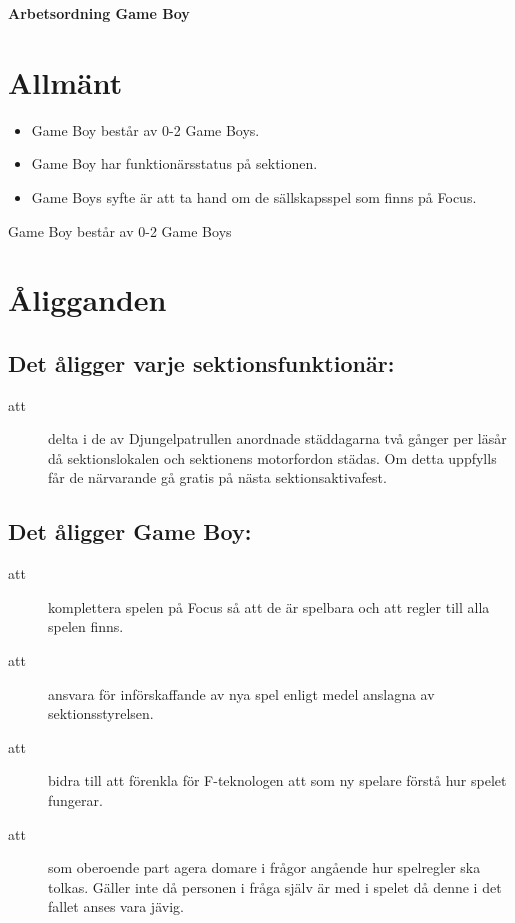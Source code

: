 \renewcommand{\dateseparator}{-} %

\renewcommand{\forening}{Game Boy}

\begin{center}
\LARGE{\textbf{Arbetsordning \forening}}
\end{center}


\section{Allmänt}
\begin{itemize}
\item Game Boy består av 0-2 Game Boys.

\item Game Boy har funktionärsstatus på sektionen.

\item Game Boys syfte är att ta hand om de sällskapsspel som finns på Focus.

\end{itemize}

Game Boy består av 0-2 Game Boys

\section{Åligganden}
\subsection{Det åligger varje sektionsfunktionär:}
    \begin{description}
      \item[att] delta i de av Djungelpatrullen anordnade städdagarna två gånger per
      läsår då sektionslokalen och sektionens motorfordon städas. Om detta uppfylls får de närvarande gå gratis på nästa
      sektionsaktivafest.
    \end{description}
\subsection{Det åligger Game Boy:}
		\begin{description}
			\item[att]  komplettera spelen på Focus så att de är spelbara och att regler till alla spelen finns.
  		\item[att] ansvara för införskaffande av nya spel enligt medel anslagna av sektionsstyrelsen.
  		\item[att] bidra till att förenkla för F-teknologen att som ny spelare förstå hur spelet fungerar.
  		\item[att] som oberoende part agera domare i frågor angående hur spelregler ska tolkas. Gäller inte då personen i fråga själv är med i spelet då denne i det fallet anses vara jävig.
  	\end{description}


